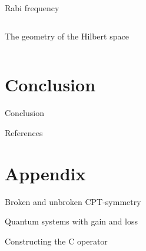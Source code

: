 \documentclass[10pt]{beamer}
\begin{document}
\begin{frame}{Rabi frequency}
\begin{columns}
    \hspace{1.5em}
    \begin{column}{\textwidth}
    \end{column}
\end{columns}
\end{frame}

\begin{frame}{The geometry of the Hilbert space}
\begin{columns}
    \hspace{1.5em}
    \begin{column}{\textwidth}
    \end{column}
\end{columns}
\end{frame}

\section{Conclusion}
\begin{frame}{Conclusion}
\end{frame}

\begin{frame}{References} 
    \nocite{*}
    
    
\end{frame}

\section{Appendix}
\begin{frame}{Broken and unbroken CPT-symmetry}
\end{frame}

\begin{frame}{Quantum systems with gain and loss}
\end{frame}

\begin{frame}{Constructing the C operator}
\end{frame}
\end{document}
